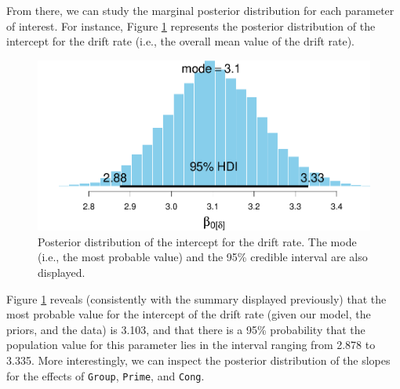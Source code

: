 \documentclass[
  11pt,
  english,
  ,doc,floatsintext]{apa6}
\newenvironment{Shaded}{}{}
\newcommand{\AttributeTok}[1]{\textcolor[rgb]{0.49,0.56,0.16}{#1}}
\newcommand{\CommentTok}[1]{\textcolor[rgb]{0.38,0.63,0.69}{\textit{#1}}}
\newcommand{\ConstantTok}[1]{\textcolor[rgb]{0.53,0.00,0.00}{#1}}
\newcommand{\DecValTok}[1]{\textcolor[rgb]{0.25,0.63,0.44}{#1}}
\newcommand{\FunctionTok}[1]{\textcolor[rgb]{0.02,0.16,0.49}{#1}}
\newcommand{\NormalTok}[1]{#1}
\newcommand{\OtherTok}[1]{\textcolor[rgb]{0.00,0.44,0.13}{#1}}
\newcommand{\SpecialCharTok}[1]{\textcolor[rgb]{0.25,0.44,0.63}{#1}}
\newcommand{\StringTok}[1]{\textcolor[rgb]{0.25,0.44,0.63}{#1}}
\begin{document}
From there, we can study the marginal posterior distribution for each parameter of interest. For instance, Figure \ref{fig:posterior-intercept-drift} represents the posterior distribution of the intercept for the drift rate (i.e., the overall mean value of the drift rate).

\begin{Shaded}
\end{Shaded}

\begin{figure}[!htb]

{\centering \includegraphics[width=0.75\linewidth]{supplementary_materials_files/figure-latex/posterior-intercept-drift-1} 

}

\caption{Posterior distribution of the intercept for the drift rate. The mode (i.e., the most probable value) and the 95\% credible interval are also displayed.}\label{fig:posterior-intercept-drift}
\end{figure}

Figure \ref{fig:posterior-intercept-drift} reveals (consistently with the summary displayed previously) that the most probable value for the intercept of the drift rate (given our model, the priors, and the data) is 3.103, and that there is a 95\% probability that the population value for this parameter lies in the interval ranging from 2.878 to 3.335. More interestingly, we can inspect the posterior distribution of the slopes for the effects of \texttt{Group}, \texttt{Prime}, and \texttt{Cong}.
\end{document}
